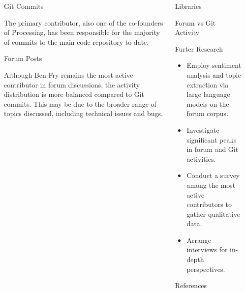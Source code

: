 \documentclass[final]{beamer}
\begin{document}
\begin{frame}[t]
\begin{columns}[t]
\begin{column}{.32\textwidth}
    \end{column}
    \begin{column}{.32\textwidth}
      \begin{block}{Git Commits}
        
        The primary contributor, also one of the co-founders of Processing, has been responsible for the majority of commits to the main code repository to date.
      \end{block}
      \begin{block}{Forum Posts}
        
        Although Ben Fry remains the most active contributor in forum discussions, the activity distribution is more balanced compared to Git commits. This may be due to the broader range of topics discussed, including technical issues and bugs.
      \end{block}
    \end{column}
    \begin{column}{.32\textwidth}
      \begin{block}{Libraries}
        
      \end{block}
      \begin{block}{Forum vs Git Activity}
        
      \end{block}
      \begin{block}{Furter Research}
        \begin{itemize}
          \item Employ sentiment analysis and topic extraction via large language models on the forum corpus.
          \item Investigate significant peaks in forum and Git activities.
          \item Conduct a survey among the most active contributors to gather qualitative data.
          \item Arrange interviews for in-depth perspectives.
        \end{itemize}
      \end{block}

      \begin{block}{References}
        \printbibliography
      \end{block}
    \end{column}
    
  \end{columns}
\end{frame}
\end{document}
